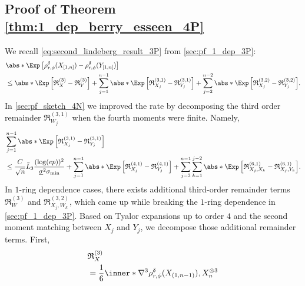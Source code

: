\documentclass[aos]{imsart}
\begin{document}
\begin{appendix}
\subsection{Proof of Theorem \ref{thm:1_dep_berry_esseen_4P}} \label{sec:pf_1_dep_4P}

We recall \cref{eq:second_lindeberg_result_3P} from \cref{sec:pf_1_dep_3P}:
\begin{equation*}
\begin{aligned}
    & \abs*{ \Exp\left[\rho_{r,\phi}^\delta(X_{[1,n]}) - \rho_{r,\phi}^\delta(Y_{[1,n]})\right]} \\
    & \leq \abs*{\Exp\left[ \mathfrak{R}_X^{(3)} - \mathfrak{R}_Y^{(3)} \right]}
    + \sum_{j=1}^{n-1} \abs*{ \Exp \left[ 
        \mathfrak{R}_{X_j}^{(3,1)} 
        - \mathfrak{R}_{Y_j}^{(3,1)} 
    \right] }
    + \sum_{j=2}^{n-2} \abs*{ \Exp\left[ \mathfrak{R}_{X_j}^{(3,2)} - \mathfrak{R}_{Y_j}^{(3,2)} \right] }.
\end{aligned}
\end{equation*}
In \cref{sec:pf_sketch_4N} we improved the rate by decomposing the third order remainder $\mathfrak{R}^{(3,1)}_{W_j}$ when the fourth moments were finite. Namely,
\begin{equation*}
\begin{aligned}
    & \sum_{j=1}^{n-1} \abs*{ \Exp \left[ 
        \mathfrak{R}_{X_j}^{(3,1)} 
        - \mathfrak{R}_{Y_j}^{(3,1)} 
    \right] }\\
    & \leq \frac{C}{\sqrt{n}} \bar{L}_{3} \frac{(\log(ep))^2}{\underline\sigma^2 \sigma_{\min}}
    + \sum_{j=1}^{n-1} \abs*{ \Exp \left[ \mathfrak{R}_{X_j}^{(4,1)} 
        - \mathfrak{R}_{Y_j}^{(4,1)} \right] }
    + \sum_{j=3}^{n-1} \sum_{k=1}^{j-2} \abs*{ \Exp \left[ 
        \mathfrak{R}_{X_j,X_k}^{(6,1)}
        - \mathfrak{R}_{X_j,Y_k}^{(6,1)}
    \right] }.
\end{aligned}
\end{equation*}
In $1$-ring dependence cases, there exists additional third-order remainder terms $\mathfrak{R}^{(3)}_{W}$ and $\mathfrak{R}^{(3,2)}_{X_j,W_k}$, which came up while breaking the $1$-ring dependence in \cref{sec:pf_1_dep_3P}. Based on Tyalor expansions up to order $4$ and the second moment matching between $X_j$ and $Y_j$, we decompose those additional remainder terms. First,
\begin{equation} \label{eq:decompose_third_remainder_P}
\begin{aligned}
    & \mathfrak{R}_X^{(3)} \\
    & = \frac{1}{6} \inner*{\nabla^3 \rho_{r,\phi}^\delta(X_{(1,n-1)}), X_n^{\otimes 3}}

\end{aligned}
\end{equation}
\end{appendix}
\end{document}

